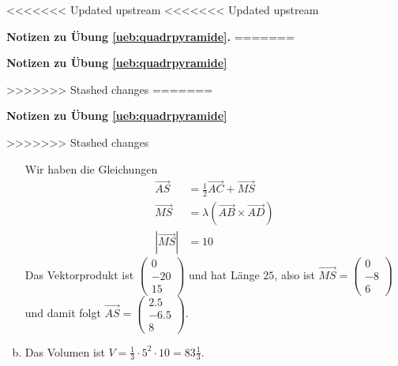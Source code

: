 \documentclass[%
11pt,%
twoside,%
titlepage,%
<<<<<<< Updated upstream
<<<<<<< Updated upstream
german,%
=======
swissgerman,%
>>>>>>> Stashed changes
=======
swissgerman,%
>>>>>>> Stashed changes
headsepline%
]{scrartcl}
\newcommand{\faReturnGray}{\textcolor{gray}{\faMailReply}} %
\newcommand{\faReturnGray}{\textcolor{gray}{\faMailReply}} %
\theoremstyle{definition}
\theoremstyle{plain}
\newcommand{\concatueb}[1]{ueb:#1}%
\newcommand{\concatlsg}[1]{lsg:#1}%
\newenvironment{lsg}[1]{%
<<<<<<< Updated upstream
<<<<<<< Updated upstream
    \par\noindent\textbf{Notizen zu Übung \ref{\concatueb{#1}}.}%
    \label{\concatlsg{#1}}
=======
    \par\noindent\textbf{Notizen zu Übung \ref{\concatueb{#1}}}\label{\concatlsg{#1}}
    \hfill\hyperref[\concatueb{#1}]{\faReturnGray}\par %
>>>>>>> Stashed changes
=======
    \par\noindent\textbf{Notizen zu Übung \ref{\concatueb{#1}}}\label{\concatlsg{#1}}
    \hfill\hyperref[\concatueb{#1}]{\faReturnGray}\par %
>>>>>>> Stashed changes
}{%
    \par%
}
\begin{document}
\begin{lsg}{quadrpyramide}
\begin{enumerate}[a)]
        Wir haben die Gleichungen
        \begin{align*}
            \vec{AS} &=\frac{1}{2}\vec{AC}+\vec{MS}\\
            \vec{MS} &= \lambda(\vec{AB}\times\vec{AD})\\
            |\vec{MS}| &= 10
        \end{align*}
        Das Vektorprodukt ist $\begin{pmatrix}
            0\\-20\\15
        \end{pmatrix}$ und hat Länge $25$, also ist $\vec{MS}=\begin{pmatrix}
            0\\-8\\6
        \end{pmatrix}$ und damit folgt $\vec{AS}=\begin{pmatrix}
            2.5\\-6.5\\8
        \end{pmatrix}$.

        \item Das Volumen ist $V=\frac{1}{3}\cdot 5^2\cdot10=83\frac{1}{3}$.
    \end{enumerate}
\end{lsg}
\end{document}
